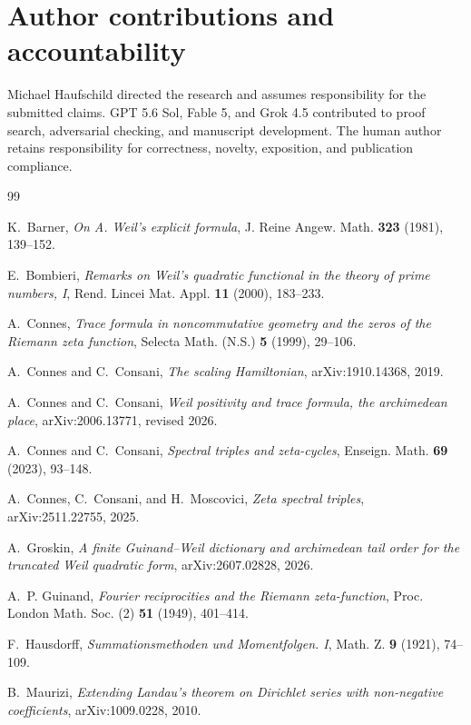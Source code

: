 \documentclass[11pt]{article}
\begin{document}
\section*{Author contributions and accountability}

Michael Haufschild directed the research and assumes responsibility for the submitted claims.
GPT 5.6 Sol, Fable 5, and Grok 4.5 contributed to proof search, adversarial checking, and
manuscript development.  The human author retains responsibility for correctness, novelty,
exposition, and publication compliance.

\begin{thebibliography}{99}

K.~Barner,
\emph{On A. Weil's explicit formula},
J. Reine Angew. Math. \textbf{323} (1981), 139--152.

E.~Bombieri,
\emph{Remarks on Weil's quadratic functional in the theory of prime numbers, I},
Rend. Lincei Mat. Appl. \textbf{11} (2000), 183--233.

A.~Connes,
\emph{Trace formula in noncommutative geometry and the zeros of the Riemann zeta function},
Selecta Math. (N.S.) \textbf{5} (1999), 29--106.

A.~Connes and C.~Consani,
\emph{The scaling Hamiltonian},
arXiv:1910.14368, 2019.

A.~Connes and C.~Consani,
\emph{Weil positivity and trace formula, the archimedean place},
arXiv:2006.13771, revised 2026.

A.~Connes and C.~Consani,
\emph{Spectral triples and zeta-cycles},
Enseign. Math. \textbf{69} (2023), 93--148.

A.~Connes, C.~Consani, and H.~Moscovici,
\emph{Zeta spectral triples},
arXiv:2511.22755, 2025.

A.~Groskin,
\emph{A finite Guinand--Weil dictionary and archimedean tail order for the truncated Weil
quadratic form},
arXiv:2607.02828, 2026.

A.~P. Guinand,
\emph{Fourier reciprocities and the Riemann zeta-function},
Proc. London Math. Soc. (2) \textbf{51} (1949), 401--414.

F.~Hausdorff,
\emph{Summationsmethoden und Momentfolgen. I},
Math. Z. \textbf{9} (1921), 74--109.

B.~Maurizi,
\emph{Extending Landau's theorem on Dirichlet series with non-negative coefficients},
arXiv:1009.0228, 2010.


\end{thebibliography}
\end{document}
